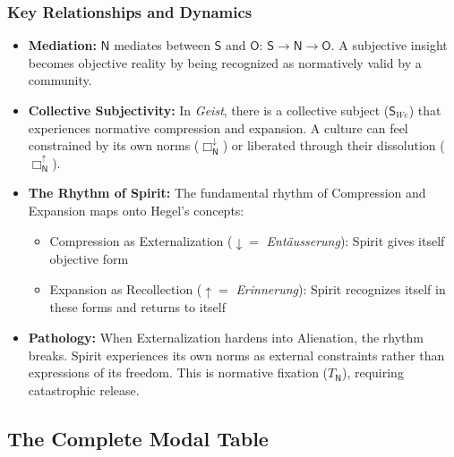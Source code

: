 \documentclass[12pt]{book}
\newcommand{\NBoxUp}{\Box_{\mathsf{N}}^{\uparrow}}
\newcommand{\NBoxDown}{\Box_{\mathsf{N}}^{\downarrow}}
\begin{document}
\subsubsection{Key Relationships and Dynamics}

\begin{itemize}
\item \textbf{Mediation:} $\mathsf{N}$ mediates between $\mathsf{S}$ and $\mathsf{O}$: $\mathsf{S} \rightarrow \mathsf{N} \rightarrow \mathsf{O}$. A subjective insight becomes objective reality by being recognized as normatively valid by a community.

\item \textbf{Collective Subjectivity:} In \textit{Geist}, there is a collective subject ($\mathsf{S}_{We}$) that experiences normative compression and expansion. A culture can feel constrained by its own norms ($\NBoxDown$) or liberated through their dissolution ($\NBoxUp$).

\item \textbf{The Rhythm of Spirit:} The fundamental rhythm of Compression and Expansion maps onto Hegel's concepts:
\begin{itemize}
\item Compression as Externalization ($\downarrow = $ \emph{Entäusserung}): Spirit gives itself objective form
\item Expansion as Recollection ($\uparrow = $ \emph{Erinnerung}): Spirit recognizes itself in these forms and returns to itself
\end{itemize}

\item \textbf{Pathology:} When Externalization hardens into Alienation, the rhythm breaks. Spirit experiences its own norms as external constraints rather than expressions of its freedom. This is normative fixation ($T_{\mathsf{N}}$), requiring catastrophic release.
\end{itemize}

\subsection{The Complete Modal Table}
\end{document}
